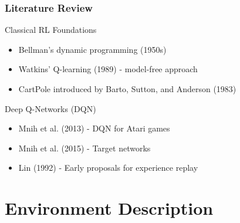 \documentclass[
    9pt,
    aspectratio=169,
]{beamer}
\begin{document}
\begin{frame}
\frametitle{Literature Review}
\begin{block}{Classical RL Foundations}
    \begin{itemize}
        \item Bellman's dynamic programming (1950s)
        \item Watkins' Q-learning (1989) - model-free approach
        \item CartPole introduced by Barto, Sutton, and Anderson (1983)
    \end{itemize}
\end{block}

\begin{block}{Deep Q-Networks (DQN)}
    \begin{itemize}
        \item Mnih et al. (2013) - DQN for Atari games
        \item Mnih et al. (2015) - Target networks
        \item Lin (1992) - Early proposals for experience replay
    \end{itemize}
\end{block}
\end{frame}

\section{Environment Description}
\end{document}
